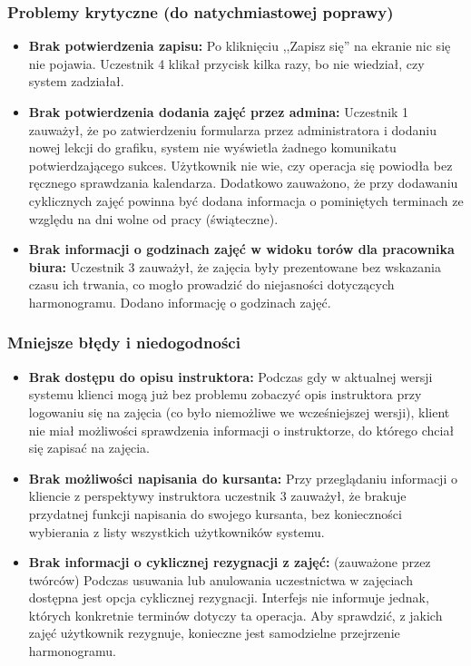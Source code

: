 \documentclass[a4paper,12pt]{article}
\begin{document}
\subsubsection*{Problemy krytyczne (do natychmiastowej poprawy)}
 
\begin{itemize}
    \item \textbf{Brak potwierdzenia zapisu:} Po kliknięciu ,,Zapisz się'' na ekranie nic się nie pojawia. Uczestnik 4 klikał przycisk kilka razy, bo nie wiedział, czy system zadziałał.
 
    \item \textbf{Brak potwierdzenia dodania zajęć przez admina:} Uczestnik 1 zauważył, że po zatwierdzeniu formularza przez administratora i dodaniu nowej lekcji do grafiku, system nie wyświetla żadnego komunikatu potwierdzającego sukces. Użytkownik nie wie, czy operacja się powiodła bez ręcznego sprawdzania kalendarza. Dodatkowo zauważono, że przy dodawaniu cyklicznych zajęć powinna być dodana informacja o pominiętych terminach ze względu na dni wolne od pracy (świąteczne).
 
    \item \textbf{Brak informacji o godzinach zajęć w widoku torów dla pracownika biura:} Uczestnik 3 zauważył, że zajęcia były prezentowane bez wskazania czasu ich trwania, co mogło prowadzić do niejasności dotyczących harmonogramu. Dodano informację o godzinach zajęć.
\end{itemize}
 
\subsubsection*{Mniejsze błędy i niedogodności}
 
\begin{itemize}
    \item \textbf{Brak dostępu do opisu instruktora:} Podczas gdy w aktualnej wersji systemu klienci mogą już bez problemu zobaczyć opis instruktora przy logowaniu się na zajęcia (co było niemożliwe we wcześniejszej wersji), klient nie miał możliwości sprawdzenia informacji o instruktorze, do którego chciał się zapisać na zajęcia.
 
    \item \textbf{Brak możliwości napisania do kursanta:} Przy przeglądaniu informacji o kliencie z perspektywy instruktora uczestnik 3 zauważył, że brakuje przydatnej funkcji napisania do swojego kursanta, bez konieczności wybierania z listy wszystkich użytkowników systemu.
 
    \item \textbf{Brak informacji o cyklicznej rezygnacji z zajęć:} (zauważone przez twórców) Podczas usuwania lub anulowania uczestnictwa w zajęciach dostępna jest opcja cyklicznej rezygnacji. Interfejs nie informuje jednak, których konkretnie terminów dotyczy ta operacja. Aby sprawdzić, z jakich zajęć użytkownik rezygnuje, konieczne jest samodzielne przejrzenie harmonogramu.
\end{itemize}
 
\end{document}
